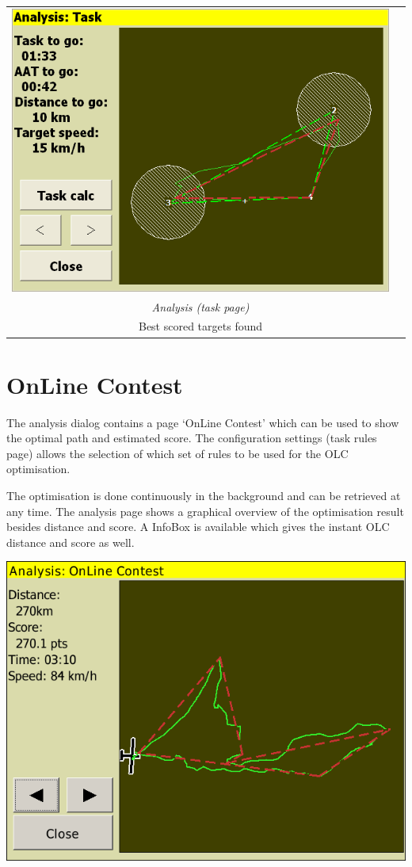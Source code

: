 \documentclass[a4paper,12pt]{refrep}
\begin{document}
\begin{maxipage}
\begin{center}
\begin{longtable}{|c|c|}
\midrule
\includegraphics[angle=0,width=0.45\linewidth,keepaspectratio='true']{figures/faat12.png} &  \\
{\em Analysis (task page)} &  \\
Best scored targets found &  \\

\bottomrule
\end{longtable}
\end{center}
\end{maxipage}

\section{OnLine Contest}

The analysis dialog contains a page `OnLine Contest' which can be
used to show the optimal path and estimated score.  The configuration settings  
(task rules page) allows the selection of which set of rules to be used for the
OLC optimisation.

The optimisation is done continuously in the background and can be retrieved at
any time. The analysis page shows a graphical overview of the optimisation
result besides distance and score. A InfoBox is available which gives the
instant OLC distance and score as well.

\begin{center}
\includegraphics[angle=0,width=0.8\linewidth,keepaspectratio='true']{figures/shot-olc.png}
\end{center}
\end{document}
